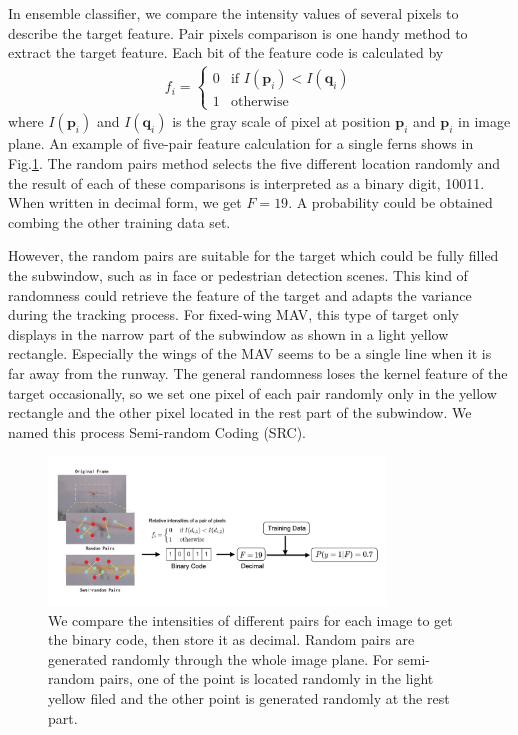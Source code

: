 In ensemble classifier, we compare the intensity values of several pixels to describe the target feature. Pair pixels comparison is one handy method to extract the target feature. Each bit of the feature code is calculated by
\begin{align}
	f_i=\left\{ \begin{array}{ll}
		0 &\mbox{if $I(\mathbf{p}_i) < I(\mathbf{q}_i)$} \\
		1 &\mbox{otherwise} \end{array} \right.
\end{align}
where $I(\mathbf{p}_i)$ and $I(\mathbf{q}_i)$ is the gray scale of pixel at position $\mathbf{p}_i$  and $\mathbf{p}_i$ in image plane. An example of five-pair feature calculation for a single ferns shows in Fig.\ref{fig:01_TLD_Code}. The random pairs method selects the five different location randomly and the result of each of these comparisons is interpreted as a binary digit, 10011. When written in decimal form, we get $F=19$. A probability could be obtained combing the other training data set.

However, the random pairs are suitable for the target which could be fully filled the subwindow, such as in face or pedestrian detection scenes. This kind of randomness could retrieve the feature of the target and adapts the variance during the tracking process. For fixed-wing MAV, this type of target only displays in the narrow part of the subwindow as shown in a light yellow rectangle. Especially the wings of the MAV seems to be a single line when it is far away from the runway. The general randomness loses the kernel feature of the target occasionally, so we set one pixel of each pair randomly only in the yellow rectangle and the other pixel located in the rest part of the subwindow.  We named this process Semi-random Coding (SRC). 

\begin{figure}[!th]
	\centering
	\includegraphics[width=0.8\textwidth]{Figs/01_TLD_Code.pdf}
	\caption{We compare the intensities of different pairs for each image to get the binary code, then store it as decimal. Random pairs are generated randomly through the whole image plane. For semi-random pairs, one of the point is located randomly in the light yellow ﬁled and the other point is generated randomly at the rest part.}
	\label{fig:01_TLD_Code}    
\end{figure}

